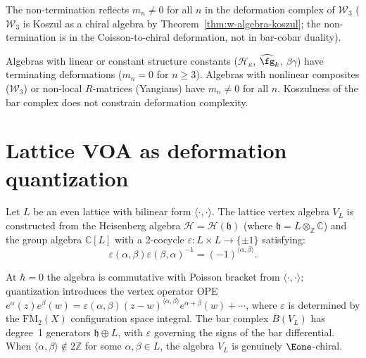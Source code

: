 \begin{computation}
The non-termination reflects $m_n \neq 0$ for all $n$ in the deformation complex of $\mathcal{W}_3$ ($\mathcal{W}_3$ is Koszul as a chiral algebra by Theorem~\ref{thm:w-algebra-koszul}; the non-termination is in the Coisson-to-chiral deformation, not in bar-cobar duality).
\end{computation}

\begin{remark}
\label{rem:deformation-complexity}
Algebras with linear or constant structure constants ($\mathcal{H}_\kappa$, $\widehat{\fg}_k$, $\beta\gamma$) have terminating deformations ($m_n = 0$ for $n \geq 3$).  Algebras with nonlinear composites ($\mathcal{W}_3$) or non-local $R$-matrices (Yangians) have $m_n \neq 0$ for all $n$.  Koszulness of the bar complex does not constrain deformation complexity.
\end{remark}


\section{Lattice VOA as deformation quantization}
\label{sec:lattice-dq}

\begin{computation}
\label{comp:lattice-cocycle-deformation}

Let $L$ be an even lattice with bilinear form $\langle \cdot, \cdot \rangle$.
The lattice vertex algebra $V_L$ is constructed from the Heisenberg
algebra $\mathcal{H} = \mathcal{H}(\mathfrak{h})$ (where $\mathfrak{h} = L \otimes_\mathbb{Z} \mathbb{C}$)
and the group algebra $\mathbb{C}[L]$ with a 2-cocycle
$\varepsilon \colon L \times L \to \{\pm 1\}$ satisfying:
\[
\varepsilon(\alpha, \beta) \varepsilon(\beta, \alpha)^{-1}
= (-1)^{\langle \alpha, \beta \rangle}.
\]

At $\hbar = 0$ the algebra is commutative with Poisson bracket from $\langle\cdot,\cdot\rangle$; quantization introduces the vertex operator OPE $e^\alpha(z)e^\beta(w) = \varepsilon(\alpha,\beta)(z-w)^{\langle\alpha,\beta\rangle}e^{\alpha+\beta}(w)+\cdots$, where $\varepsilon$ is determined by the $\overline{\mathrm{FM}}_2(X)$ configuration space integral.  The bar complex $\bar{B}(V_L)$ has degree~1 generators $\mathfrak{h}\oplus L$, with $\varepsilon$ governing the signs of the bar differential.  When $\langle\alpha,\beta\rangle\notin 2\mathbb{Z}$ for some $\alpha,\beta\in L$, the algebra $V_L$ is genuinely $\Eone$-chiral.
\end{computation}

